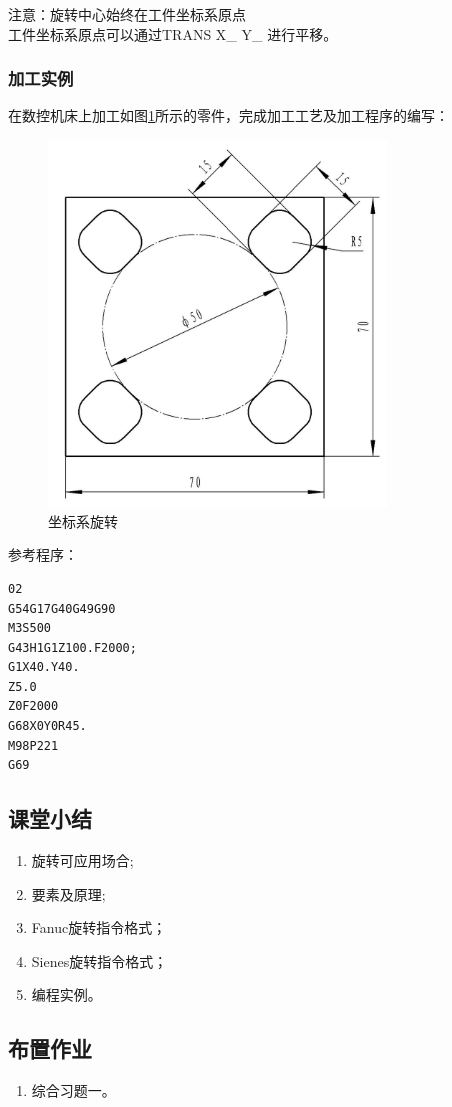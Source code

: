 注意：旋转中心始终在工件坐标系原点\\
工件坐标系原点可以通过TRANS X\_ Y\_ 进行平移。\\

\subsubsection{加工实例}
在数控机床上加工如图\ref{坐标系旋转}所示的零件，完成加工工艺及加工程序的编写：
\begin{figure}[!hbtp]
	\centering	\includegraphics[width=0.8\textwidth]{images/7-2.jpg}
	\caption{坐标系旋转} \label{坐标系旋转}
\end{figure}
参考程序：

\begin{lstlisting}
02
G54G17G40G49G90
M3S500
G43H1G1Z100.F2000;
G1X40.Y40.
Z5.0
Z0F2000
G68X0Y0R45.
M98P221
G69
\end{lstlisting}


\subsection{课堂小结}
\begin{enumerate}[1、]
	\item 旋转可应用场合;
	\item 要素及原理;
	\item Fanuc旋转指令格式；
	\item Sienes旋转指令格式；
	\item 编程实例。
\end{enumerate}

\vfill
\subsection{布置作业}
\begin{enumerate}[1、]
	\item 综合习题一。 
\end{enumerate}
\vfill